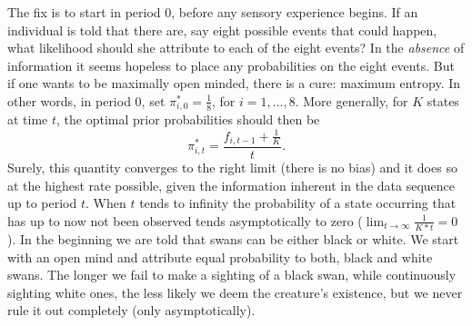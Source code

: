 \documentclass[11pt]{article}
\begin{document}
The fix is to start in period $0$, before any sensory experience begins. If an individual is told that there are, say eight possible events that could happen, what likelihood should she attribute to each of the eight events? In the \textit{absence} of information it seems hopeless to place any probabilities on the eight events. But if one wants to be maximally open minded, there is a cure: maximum entropy.  In other words, in period $0$, set $\pi_{i,0}^{*}=\frac{1}{8}$, for $i=1, \ldots, 8$. More generally, for $K$ states at time $t$, the optimal prior probabilities should then be
\begin{equation}  
\pi_{i, t}^{*}=\frac{f_{i, t-1}+\frac{1}{K}}{t}.
\end{equation}
Surely, this quantity converges to the right limit (there is no bias) and it does so at the highest rate possible, given the information inherent in the data sequence up to period $t$. When $t$ tends to infinity the probability of a state occurring that has up to now not been observed tends asymptotically to zero ($\lim_{t\rightarrow\infty}\frac{1}{K*t}=0$).  In the beginning we are told that swans can be either black or white. We start with an open mind and attribute equal probability to both, black and white swans. The longer we fail to make a sighting of a black swan, while continuously sighting white ones, the less likely we deem the creature's existence, but we never rule it out completely (only asymptotically). 



\end{document}
